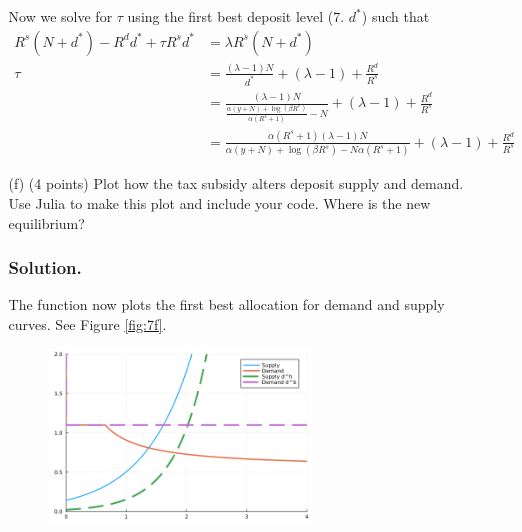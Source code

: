 \documentclass[12pt]{article}
\begin{document}
\begin{enumerate}
\begin{enumerate}
        Now we solve for $\tau$ using the first best deposit level (7. $d^*$) such that  
        \begin{align*}
            R^s(N+d^*) - R^dd^* + \tau R^s d^* &= \lambda R^s (N+d^*)
            \\ \tau &= \frac{\left(\lambda-1\right)N}{d^{*}}+\left(\lambda-1\right)+\frac{R^{d}}{R^{s}}
            \\ &= \frac{\left(\lambda-1\right)N}{\frac{\alpha\left(y+N\right)+\log\left(\beta R^{s}\right)}{\alpha\left(R^{s}+1\right)}-N}+\left(\lambda-1\right)+\frac{R^{d}}{R^{s}}
             \\ &= \frac{\alpha\left(R^{s}+1\right)\left(\lambda-1\right)N}{\alpha\left(y+N\right)+\log\left(\beta R^{s}\right)-N\alpha\left(R^{s}+1\right)}+\left(\lambda-1\right)+\frac{R^{d}}{R^{s}}
        \end{align*}
        
        \item[(f)] {(4 points)} Plot how the tax subsidy alters deposit supply and demand. Use Julia to make this plot and include your code. Where is the new equilibrium?
        \subsubsection*{Solution.}

        The function now plots the first best allocation for demand and supply curves. See Figure \eqref{fig:7f}.

        \begin{figure}%
            \centering
                \includegraphics[width=0.7\textwidth]{7f.png}
                \caption{ }
                \label{fig:7f}
        \end{figure}
        
        
    \end{enumerate}

\end{enumerate}
\end{document}
